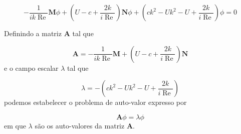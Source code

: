 \documentclass[a4paper,portuguese,10pt]{article}
\renewcommand{\vec}{\mathbf}
\renewcommand{\Re}{\operatorname{Re}}
\begin{document}
\begin{equation}
  -\frac{1}{ik\Re}\vec{M}\phi+\left(U-c+\frac{2k}{i\Re}\right)\vec{N}\phi+\left(ck^2-Uk^2-U+\frac{2k}{i\Re}\right)\phi=0
  \label{eq_o-s_discreta_01}
\end{equation}

Definindo a matriz $\vec{A}$ tal que 

\begin{equation}
\vec{A}=-\frac{1}{ik\Re}\vec{M}+\left(U-c+\frac{2k}{i\Re}\right)\vec{N}
\end{equation}
e o campo escalar $\lambda$ tal que

\begin{equation}
\lambda=-\left(ck^2-Uk^2-U+\frac{2k}{i\Re}\right)
\end{equation}
podemos estabelecer o problema de auto-valor expresso por

\begin{equation}
  \vec{A}\phi = \lambda\phi
\end{equation}
em que $\lambda$ são os auto-valores da matriz $\vec{A}$.

\singlespacing



\end{document}
